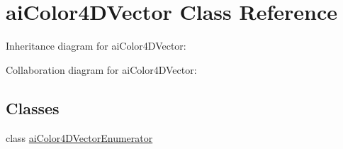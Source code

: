 \hypertarget{classai_color4_d_vector}{\section{ai\+Color4\+D\+Vector Class Reference}
\label{classai_color4_d_vector}
}


Inheritance diagram for ai\+Color4\+D\+Vector\+:


Collaboration diagram for ai\+Color4\+D\+Vector\+:
\subsection*{Classes}
\begin{DoxyCompactItemize}
\item 
class \hyperlink{classai_color4_d_vector_1_1ai_color4_d_vector_enumerator}{ai\+Color4\+D\+Vector\+Enumerator}
\end{DoxyCompactItemize}
